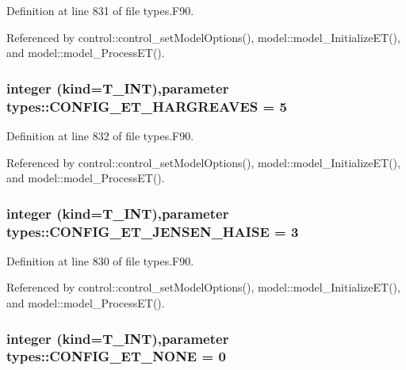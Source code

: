 Definition at line 831 of file types.F90.



Referenced by control::control\_\-setModelOptions(), model::model\_\-InitializeET(), and model::model\_\-ProcessET().

\hypertarget{namespacetypes_a49692bf2a330b895cc7748e71c099d36}{
\subsubsection[{CONFIG\_\-ET\_\-HARGREAVES}]{\setlength{\rightskip}{0pt plus 5cm}integer (kind={\bf T\_\-INT}),parameter {\bf types::CONFIG\_\-ET\_\-HARGREAVES} = 5}}
\label{namespacetypes_a49692bf2a330b895cc7748e71c099d36}


Definition at line 832 of file types.F90.



Referenced by control::control\_\-setModelOptions(), model::model\_\-InitializeET(), and model::model\_\-ProcessET().

\hypertarget{namespacetypes_a96a773d2a9e9595b49aaee65d3618d28}{
\subsubsection[{CONFIG\_\-ET\_\-JENSEN\_\-HAISE}]{\setlength{\rightskip}{0pt plus 5cm}integer (kind={\bf T\_\-INT}),parameter {\bf types::CONFIG\_\-ET\_\-JENSEN\_\-HAISE} = 3}}
\label{namespacetypes_a96a773d2a9e9595b49aaee65d3618d28}


Definition at line 830 of file types.F90.



Referenced by control::control\_\-setModelOptions(), model::model\_\-InitializeET(), and model::model\_\-ProcessET().

\hypertarget{namespacetypes_aa00d17553b5924914a0c6101d2a3af21}{
\subsubsection[{CONFIG\_\-ET\_\-NONE}]{\setlength{\rightskip}{0pt plus 5cm}integer (kind={\bf T\_\-INT}),parameter {\bf types::CONFIG\_\-ET\_\-NONE} = 0}}
\label{namespacetypes_aa00d17553b5924914a0c6101d2a3af21}


